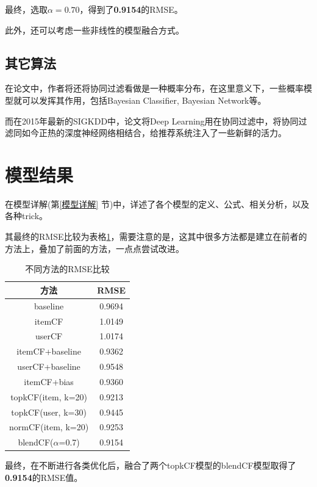 \documentclass[utf8, a4paper, 11pt, onecolumn]{ctexart}
\begin{document}
\begin{spacing}{1.3}
最终，选取$\alpha = 0.70$，得到了\textbf{0.9154}的RMSE。

此外，还可以考虑一些非线性的模型融合方式。

\subsection{其它算法}

在论文\cite{breese1998empirical}中，作者将还将协同过滤看做是一种概率分布，在这里意义下，一些概率模型就可以发挥其作用，包括Bayesian Classifier, Bayesian Network等。

而在2015年最新的SIGKDD中，论文\cite{wang2015collaborative}将Deep Learning用在协同过滤中，将协同过滤同如今正热的深度神经网络相结合，给推荐系统注入了一些新鲜的活力。

\section{模型结果}

在模型详解(第\ref{模型详解} 节)中，详述了各个模型的定义、公式、相关分析，以及各种trick。

其最终的RMSE比较为表格\ref{RMSE-table}，需要注意的是，这其中很多方法都是建立在前者的方法上，叠加了前面的方法，一点点尝试改进。

\begin{table}[h]
	\centering
	\begin{tabular}{|c|c|}
		\hline
		\textbf{方法} & \textbf{RMSE} \\
		\hline
		baseline &   0.9694 \\
		\hline
		itemCF &  1.0149 \\
		\hline
		userCF & 1.0174 \\
		\hline
		itemCF+baseline &  0.9362 \\
		\hline
		userCF+baseline & 0.9548 \\
		\hline
		itemCF+bias & 0.9360 \\
		\hline
		topkCF(item, k=20) & 0.9213 \\
		\hline
		topkCF(user, k=30) &0.9445 \\
		\hline
		normCF(item, k=20) &0.9253 \\
		\hline
		blendCF($\alpha$=0.7) & 0.9154 \\		
		\hline
	\end{tabular}
	\caption{不同方法的RMSE比较}
	\label{RMSE-table}
\end{table}

最终，在不断进行各类优化后，融合了两个topkCF模型的blendCF模型取得了\textbf{0.9154}的RMSE值。


\end{spacing}
\end{document}
